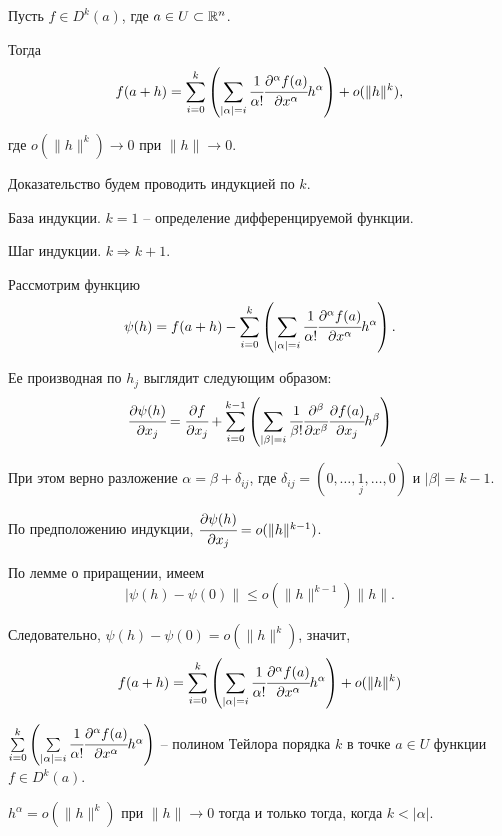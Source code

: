 	\begin{theorem}
		Пусть $f\in D^k(a)$, где $a\in U \subset \mathbb{R}^n$.
		
		Тогда
		$$
			f(a+h) = \sum\limits_{i=0}^k \left( \sum\limits_{|\alpha|=i} \cfrac {1}{\alpha!}  \cfrac {\partial^\alpha f(a)}{\partial x^\alpha} h^\alpha\right) + o(\|h\|^k),
		$$
		
		где $o(\|h\|^k) \to 0$ при $\|h\|\to 0$.
	\end{theorem}
	\begin{Proof}
		Доказательство будем проводить индукцией по $k$.
		
		База индукции. $k=1$ -- определение дифференцируемой функции.
		
		Шаг индукции. $k \Rightarrow k+1$. 
		
		Рассмотрим функцию $$\psi(h) = f(a+h) - \sum\limits_{i=0}^k \left( \sum\limits_{|\alpha|=i} \cfrac {1}{\alpha!}  \cfrac {\partial^\alpha f(a)}{\partial x^\alpha} h^\alpha\right).$$
		
		Ее производная по $h_j$ выглядит следующим образом:
		$$
			\cfrac {\partial \psi(h)} {\partial x_j} = \cfrac {\partial f} {\partial x_j} + \sum\limits_{i=0}^{k-1} \left( \sum\limits_{|\beta|=i} \cfrac {1}{\beta!}  \cfrac {\partial^\beta }{\partial x^\beta} \cfrac {\partial f(a)}{\partial x_j} h^\beta\right)
		$$
		
		При этом верно разложение $\alpha = \beta + \delta_{ij}$, где $\delta_{ij} = (0, \dots, \underset{j}{1}, \dots, 0)$ и $|\beta| = k-1$.
		
		По предположению индукции, $\cfrac {\partial \psi(h)} {\partial x_j} = o(\|h\|^{k-1})$.
		
		По лемме о приращении, имеем
		$$
			|\psi(h)-\psi(0)\| \le o(\|h\|^{k-1})\|h\|.
		$$
		
		Следовательно, $\psi(h) - \psi(0) = o(\|h\|^k)$, значит, 
		$$
			f(a+h) = \sum\limits_{i=0}^k \left( \sum\limits_{|\alpha|=i} \cfrac {1}{\alpha!}  \cfrac {\partial^\alpha f(a)}{\partial x^\alpha} h^\alpha\right) + o(\|h\|^k)
		$$
	\end{Proof}

	\begin{mdef}
		$
		\sum\limits_{i=0}^k \left( \sum\limits_{|\alpha|=i} \cfrac {1}{\alpha!}  \cfrac {\partial^\alpha f(a)}{\partial x^\alpha} h^\alpha\right)
		$ -- полином Тейлора порядка $k$ в точке $a\in U$ функции $f\in D^k(a)$.
	\end{mdef}

	\begin{lemma}
		$h^\alpha = o(\|h\|^k)$ при $\|h\|\to0$ тогда и только тогда, когда $k < |\alpha|$.
	\end{lemma}

